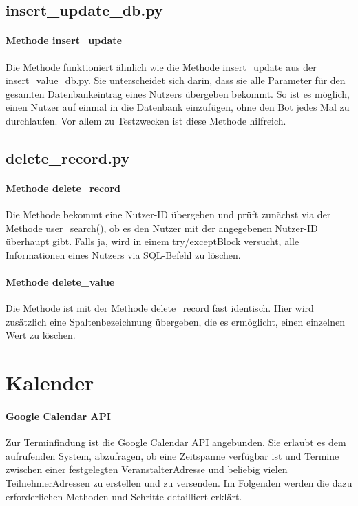         \subsection{insert\_update\_db.py}
            \paragraph{Methode insert\_update}
                Die Methode funktioniert ähnlich wie die Methode insert\_update aus der insert\_value\_db.py. Sie unterscheidet sich darin, dass sie alle Parameter für den gesamten Datenbankeintrag eines Nutzers übergeben bekommt. So ist es möglich, einen Nutzer auf einmal in die Datenbank einzufügen, ohne den Bot jedes Mal zu durchlaufen. Vor allem zu Testzwecken ist diese Methode hilfreich.
        
        \subsection{delete\_record.py}
            \paragraph{Methode delete\_record}
                Die Methode bekommt eine Nutzer-ID übergeben und prüft zunächst via der Methode user\_search(), ob es den Nutzer mit der angegebenen Nutzer-ID überhaupt gibt. Falls ja, wird in einem try/except\-Block versucht, alle Informationen eines Nutzers via SQL-Befehl zu löschen. 


            \paragraph{Methode delete\_value}
                Die Methode ist mit der Methode delete\_record fast identisch. Hier wird zusätzlich eine Spaltenbezeichnung übergeben, die es ermöglicht, einen einzelnen Wert zu löschen.


    \section{Kalender}
        \paragraph{Google Calendar API}
            Zur Terminfindung ist die Google Calendar API angebunden. \cite{GoogleCloudConsole} Sie erlaubt es dem aufrufenden System, abzufragen, ob eine Zeitspanne verfügbar ist und Termine zwischen einer festgelegten Veranstalter\-Adresse und beliebig vielen Teilnehmer\-Adressen zu erstellen und zu versenden. \cite{googleCalAPI} Im Folgenden werden die dazu erforderlichen Methoden und Schritte detailliert erklärt.

